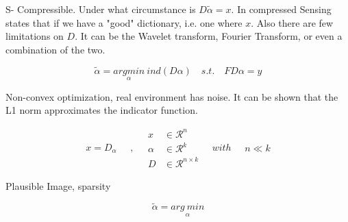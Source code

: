 S- Compressible. Under what circumstance is $D\tilde{\alpha} = x$. In compressed Sensing states that if we have a "good" dictionary, i.e. one where $x$. Also there are few limitations on $D$. It can be the Wavelet transform, Fourier Transform, or even a combination of the two.

\begin{equation}\label{intro:ssparseland}
\tilde{\alpha} =  \underset{\alpha}{arg min} \: \mathit{ind}(D\alpha) \quad s. t. \quad FD\alpha = y
\end{equation}

Non-convex optimization, real environment has noise. It can be shown that the L1 norm approximates the indicator function.

\begin{equation}\label{intro:sparseland}
\begin{split}
x  =  D_{\alpha}
\end{split}
\quad , \quad
\begin{split}
x &\in \mathcal{R}^n\\
\alpha &\in \mathcal{R}^k\\
D &\in \mathcal{R}^{n \times k}
\end{split}
\quad with \quad
\begin{split}
n \ll k
\end{split}
\end{equation}

Plausible Image, sparsity

\begin{equation}\label{cs:noiseless}
\tilde{\alpha} =  \underset{\alpha}{arg\: min}
\end{equation}

